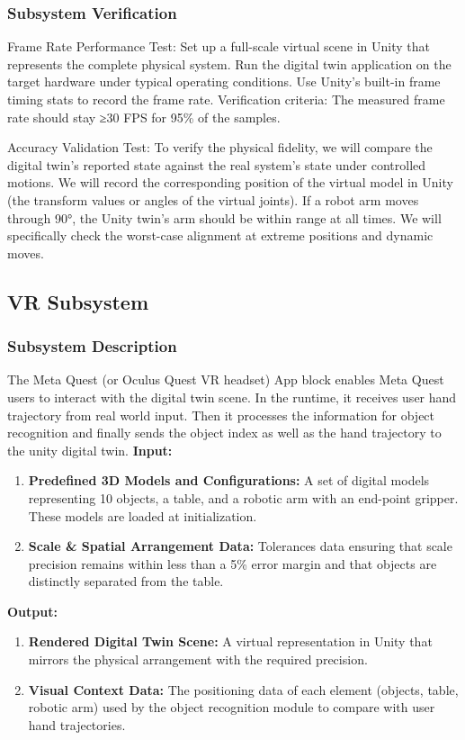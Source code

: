 \documentclass{senior-design}
\begin{document}
\subsubsection*{Subsystem Verification}
Frame Rate Performance Test: Set up a full-scale virtual scene in Unity that 
represents the complete physical system. Run the digital twin application on 
the target hardware under typical operating conditions. Use Unity's built-in 
frame timing stats to record the frame rate. Verification criteria: The 
measured frame rate should stay ≥30 FPS for 95\% of the samples. 
  
Accuracy Validation Test: To verify the physical fidelity, we will compare 
the digital twin's reported state against the real system's state under 
controlled motions. We will record the corresponding position of the virtual 
model in Unity (the transform values or angles of the virtual joints). If a 
robot arm moves through 90°, the Unity twin's arm should be within range at 
all times. We will specifically check the worst-case alignment at extreme 
positions and dynamic moves. 
\subsection{VR Subsystem}
\subsubsection*{Subsystem Description}
The Meta Quest (or Oculus Quest VR headset) App block enables Meta Quest users to interact with the digital twin scene. In the runtime, it receives user hand trajectory from real world input. Then it processes the information for object recognition and finally sends the object index as well as the hand trajectory to the unity digital twin. 
\textbf{Input:}  
\begin{enumerate}
    \item \textbf{Predefined 3D Models and Configurations:} A set of digital models representing 10 objects, a table, and a robotic arm with an end-point gripper. These models are loaded at initialization.
    \item \textbf{Scale \& Spatial Arrangement Data:} Tolerances data ensuring that scale precision remains within less than a 5\% error margin and that objects are distinctly separated from the table.
\end{enumerate}
\textbf{Output:} 
\begin{enumerate}
    \item \textbf{Rendered Digital Twin Scene:} A virtual representation in Unity that mirrors the physical arrangement with the required precision. 
    \item \textbf{Visual Context Data:} The positioning data of each element (objects, table, robotic arm) used by the object recognition module to compare with user hand trajectories. 
\end{enumerate}
\end{document}
